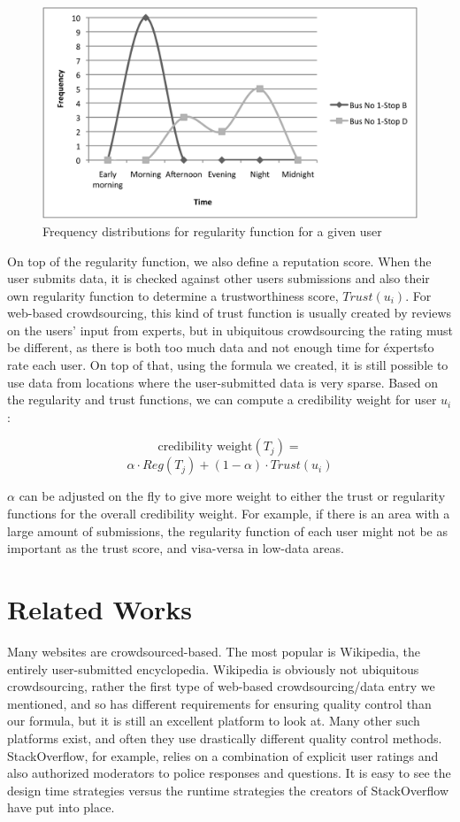 \documentclass[9pt,twocolumn]{article}
\begin{document}
	\begin{figure}
		\includegraphics[width=\columnwidth]{freq-dist}
		\caption{Frequency distributions for regularity function for a given user}
		\label{fig-freq}
	\end{figure}
	
	On top of the regularity function, we also define a reputation score. When the user submits data, it is checked against other users submissions and also their own regularity function to determine a trustworthiness score, $Trust(u_i)$. For web-based crowdsourcing, this kind of trust function is usually created by reviews on the users' input from experts, but in ubiquitous crowdsourcing the rating must be different, as there is both too much data and not enough time for \'experts\' to rate each user. On top of that, using the formula we created, it is still possible to use data from locations where the user-submitted data is very sparse. Based on the regularity and trust functions, we can compute a credibility weight for user $u_i$:
	
	$$\text{credibility weight} (T_j) = $$ 
	$$\alpha \cdot Reg(T_j) + (1 - \alpha) \cdot Trust(u_i)$$
	
	$\alpha$ can be adjusted on the fly to give more weight to either the trust or regularity functions for the overall credibility weight. For example, if there is an area with a large amount of submissions, the regularity function of each user might not be as important as the trust score, and visa-versa in low-data areas.
	
	\section*{Related Works}	
	Many websites are crowdsourced-based. The most popular is Wikipedia, the entirely user-submitted encyclopedia. Wikipedia is obviously not ubiquitous crowdsourcing, rather the first type of web-based crowdsourcing/data entry we mentioned, and so has different requirements for ensuring quality control than our formula, but it is still an excellent platform to look at. Many other such platforms exist, and often they use drastically different quality control methods. StackOverflow, for example, relies on a combination of explicit user ratings and also authorized moderators to police responses and questions. It is easy to see the design time strategies versus the runtime strategies the creators of StackOverflow have put into place. 
	
\end{document}
